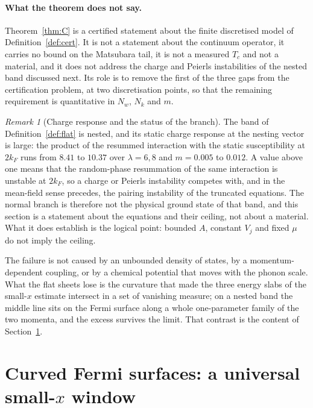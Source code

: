 \documentclass[11pt]{article}
\theoremstyle{definition}
\theoremstyle{remark}
\newtheorem{remark}[theorem]{Remark}
\begin{document}
\paragraph{What the theorem does not say.} Theorem~\ref{thm:C} is a certified statement about the finite discretised model of Definition~\ref{def:cert}. It is not a statement about the continuum operator, it carries no bound on the Matsubara tail, it is not a measured $T_c$ and not a material, and it does not address the charge and Peierls instabilities of the nested band discussed next. Its role is to remove the first of the three gaps from the certification problem, at two discretisation points, so that the remaining requirement is quantitative in $N_w$, $N_k$ and $m$.

\begin{remark}[Charge response and the status of the branch]\label{rem:cdw}
The band of Definition~\ref{def:flat} is nested, and its static charge response at the nesting vector is large: the product of the resummed interaction with the static susceptibility at $2k_F$ runs from $8.41$ to $10.37$ over $\lambda=6,8$ and $m=0.005$ to $0.012$. A value above one means that the random-phase resummation of the same interaction is unstable at $2k_F$, so a charge or Peierls instability competes with, and in the mean-field sense precedes, the pairing instability of the truncated equations. The normal branch is therefore not the physical ground state of that band, and this section is a statement about the equations and their ceiling, not about a material. What it does establish is the logical point: bounded $A$, constant $V_j$ and fixed $\mu$ do not imply the ceiling.
\end{remark}

The failure is not caused by an unbounded density of states, by a momentum-dependent coupling, or by a chemical potential that moves with the phonon scale. What the flat sheets lose is the curvature that made the three energy slabs of the small-$x$ estimate intersect in a set of vanishing measure; on a nested band the middle line sits on the Fermi surface along a whole one-parameter family of the two momenta, and the excess survives the limit. That contrast is the content of Section~\ref{sec:curved}.

\section{Curved Fermi surfaces: a universal small-\texorpdfstring{$x$}{x} window}\label{sec:curved}
\end{document}
